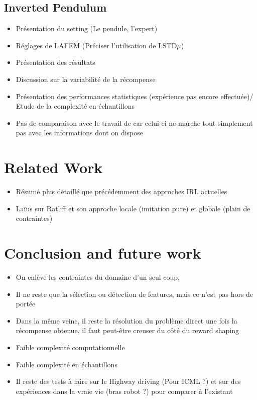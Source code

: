 \documentclass[publibook-draft]{CAp2012}
\begin{document}
\subsection{Inverted Pendulum}
\begin{itemize}
\item Présentation du setting (Le pendule, l'expert)
\item Réglages de LAFEM (Préciser l'utilisation de LSTD$\mu$)
\item Présentation des résultats
\item Discussion sur la variabilité de la récompense
\item Présentation des performances statistiques (expérience pas encore effectuée)/ Etude de la complexité en échantillons 
\item Pas de comparaison avec le travail de \cite{abbeel2004apprenticeship} car celui-ci ne marche tout simplement pas avec les informations dont on dispose
\end{itemize}
\section{Related Work}
\begin{itemize}
\item Résumé plus détaillé que précédemment des approches IRL actuelles
\item Laïus sur Ratliff et son approche locale (imitation pure) et globale (plain de contraintes)
\end{itemize}
\section{Conclusion and future work}
\begin{itemize}
\item On enlève les contraintes du domaine d'un seul coup, 
\item Il ne reste que la sélection ou détection de features, mais ce n'est pas hors de portée
\item Dans la même veine, il reste la résolution du problème direct une fois la récompense obtenue, il faut peut-être creuser du côté du reward shaping
\item Faible complexité computationnelle
\item Faible complexité en échantillons
\item Il reste des tests à faire sur le Highway driving (Pour ICML ?) et sur des expériences dans la vraie vie (bras robot ?) pour comparer à l'existant
\end{itemize}
%
%

\end{document}
